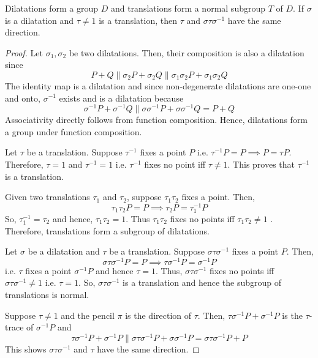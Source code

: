 \begin{theorem}
    Dilatations form a group $D$ and translations form a normal subgroup $T$ of $D$. If $\sigma$ is a dilatation and $\tau \neq 1$ is a translation, then $\tau$ and $\sigma \tau \sigma^{-1}$ have the same direction.
\end{theorem}
\begin{proof}
    Let $\sigma_1, \sigma_2$ be two dilatations. Then, their composition is also
    a dilatation since
    \[ P+Q \parallel \sigma_2 P + \sigma_2 Q \parallel \sigma_1 \sigma_2 P+ \sigma_1 \sigma_2 Q \]
    The identity map is a dilatation and since non-degenerate dilatations are one-one and onto, $\sigma^{-1}$ exists and is a dilatation because
    \[ \sigma^{-1}P+\sigma^{-1}Q \parallel \sigma\sigma^{-1}P+\sigma\sigma^{-1}Q = P+Q \]
    Associativity directly follows from function composition. Hence, dilatations form a group under function composition.

    Let $\tau$ be a translation. Suppose $\tau^{-1}$ fixes a point $P$ i.e. $\tau^{-1}P=P \implies P=\tau P$. Therefore, $\tau = 1$ and $\tau^{-1}=1$ i.e. $\tau^{-1}$ fixes no point iff $\tau \neq 1$. This proves that $\tau^{-1}$ is a translation.

    \vspace{1ex}

    \noindent
    Given two translations $\tau_1$ and $\tau_2$, suppose $\tau_1 \tau_2$ fixes a point. Then,
    \[ \tau_1 \tau_2 P=P \implies \tau_2 P= \tau_1^{-1}P \]
    So, $\tau_1^{-1} =\tau_2$ and hence, $\tau_1 \tau_2=1$. Thus $\tau_1 \tau_2$ fixes no points iff $\tau_1 \tau_2 \neq 1$ .
    Therefore, translations form a subgroup of dilatations.

    \vspace{1ex}

    \noindent
    Let $\sigma$ be a dilatation and $\tau$ be a translation. Suppose $\sigma \tau \sigma^{-1}$ fixes a point $P$. Then,
    \[ \sigma \tau \sigma^{-1}P=P \implies \tau \sigma^{-1}P=\sigma^{-1}P \]
    i.e. $\tau$ fixes a point $\sigma^{-1}P$ and hence $\tau = 1$. Thus, $\sigma \tau \sigma^{-1}$ fixes no points iff $\sigma \tau \sigma^{-1} \neq 1$ i.e. $\tau = 1$. So, $\sigma \tau \sigma^{-1}$ is a translation and hence the subgroup of translations is normal.

    \vspace{1ex}

    \noindent
    Suppose $\tau \neq 1$ and the pencil $\pi$ is the direction of $\tau$. Then, $\tau \sigma^{-1}P+\sigma^{-1}P$ is the $\tau$-trace of $\sigma^{-1}P$ and
    \[ \tau \sigma^{-1}P+\sigma^{-1}P \parallel \sigma \tau \sigma^{-1}P+ \sigma \sigma^{-1}P = \sigma \tau \sigma^{-1}P+ P \]
    This shows $\sigma \tau \sigma^{-1}$ and $\tau$ have the same direction.
    
\end{proof}

